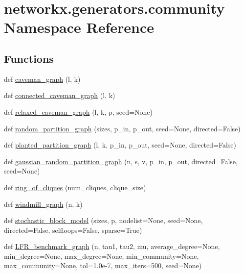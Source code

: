 \hypertarget{namespacenetworkx_1_1generators_1_1community}{}\section{networkx.\+generators.\+community Namespace Reference}
\label{namespacenetworkx_1_1generators_1_1community}
\subsection*{Functions}
\begin{DoxyCompactItemize}
\item 
def \hyperlink{namespacenetworkx_1_1generators_1_1community_a5a923d44ea3d13312625c65b2e0ff58f}{caveman\+\_\+graph} (l, k)
\item 
def \hyperlink{namespacenetworkx_1_1generators_1_1community_a28d88705711d5144ae535c533a957a0d}{connected\+\_\+caveman\+\_\+graph} (l, k)
\item 
def \hyperlink{namespacenetworkx_1_1generators_1_1community_ad08eda5b90825de22cc1061ecb62f564}{relaxed\+\_\+caveman\+\_\+graph} (l, k, p, seed=None)
\item 
def \hyperlink{namespacenetworkx_1_1generators_1_1community_a05c6dd9281e81b11a8fa71040950b420}{random\+\_\+partition\+\_\+graph} (sizes, p\+\_\+in, p\+\_\+out, seed=None, directed=False)
\item 
def \hyperlink{namespacenetworkx_1_1generators_1_1community_ae16fcc8fc4eb0b626eb26c4e8a282ff1}{planted\+\_\+partition\+\_\+graph} (l, k, p\+\_\+in, p\+\_\+out, seed=None, directed=False)
\item 
def \hyperlink{namespacenetworkx_1_1generators_1_1community_a252376cc2f95931d973271551c25bd1f}{gaussian\+\_\+random\+\_\+partition\+\_\+graph} (n, s, v, p\+\_\+in, p\+\_\+out, directed=False, seed=None)
\item 
def \hyperlink{namespacenetworkx_1_1generators_1_1community_a08598aa780b4d5021b99d82a6cd499c1}{ring\+\_\+of\+\_\+cliques} (num\+\_\+cliques, clique\+\_\+size)
\item 
def \hyperlink{namespacenetworkx_1_1generators_1_1community_a75c382b5879da332996f5ec2bfea4c6b}{windmill\+\_\+graph} (n, k)
\item 
def \hyperlink{namespacenetworkx_1_1generators_1_1community_a4093ce10a6704e73cc39103ffcefb13b}{stochastic\+\_\+block\+\_\+model} (sizes, p, nodelist=None, seed=None, directed=False, selfloops=False, sparse=True)
\item 
def \hyperlink{namespacenetworkx_1_1generators_1_1community_a32cd806ad1089ad3b643e09338fe2ba0}{L\+F\+R\+\_\+benchmark\+\_\+graph} (n, tau1, tau2, mu, average\+\_\+degree=None, min\+\_\+degree=None, max\+\_\+degree=None, min\+\_\+community=None, max\+\_\+community=None, tol=1.\+0e-\/7, max\+\_\+iters=500, seed=\+None)
\end{DoxyCompactItemize}


